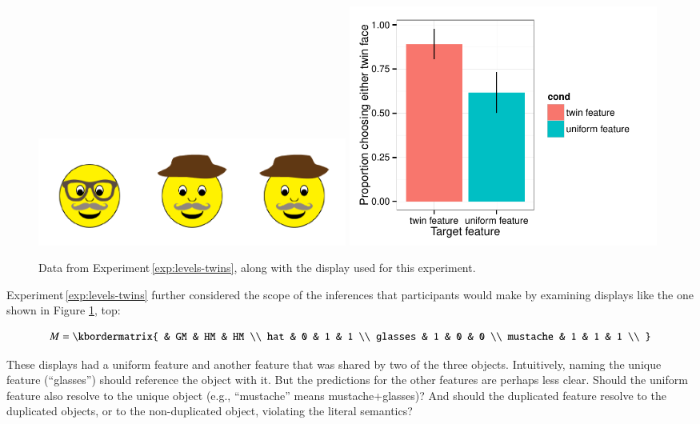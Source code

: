 \documentclass[man,noapacite]{apa2}
\newcounter{Experiment}
\newcommand{\exptref}[1]{Experiment\,\ref{#1}}
\begin{document}
 \begin{figure}[t]
  \centering
  \includegraphics[width=4in]{figures/levels-twins-stim.pdf}
  \includegraphics[width=4in]{../plots/3-levels-twins.pdf}
  \caption{\label{fig:levels-twins} Data from \exptref{exp:levels-twins}, along with the display used for this experiment.}
\end{figure}

\exptref{exp:levels-twins} further considered the scope of the inferences that participants would make by examining displays like the one shown in Figure \ref{fig:levels-twins}, top:

\begin{equation}
    M = \kbordermatrix{
               & GM & HM & HM \\
      hat      & 0  & 1  & 1  \\
      glasses  & 1  & 0  & 0 \\
      mustache & 1  & 1  & 1 \\
    }
\end{equation}

\noindent These displays had a uniform feature and another feature that was shared by two of the three objects. Intuitively, naming the unique feature (``glasses'') should reference the object with it. But the predictions for the other features are perhaps less clear. Should the uniform feature also resolve to the unique object (e.g., ``mustache'' means {\sc mustache+glasses})? And should the duplicated feature resolve to the duplicated objects, or to the non-duplicated object, violating the literal semantics?
\end{document}

